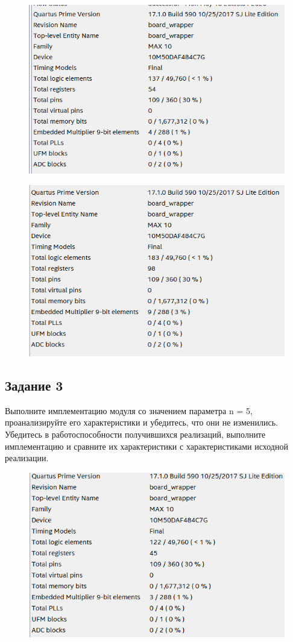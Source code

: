 \documentclass[a4paper,14pt]{article}
\begin{document}
	\begin{figure}[H]
		\centering
		\includegraphics[width=0.8\linewidth]{images/z2_5}
		\caption{}
		\label{fig:z25}
	\end{figure}
	
	\begin{figure}[H]
		\centering
		\includegraphics[width=0.8\linewidth]{images/z2_10}
		\caption{}
		\label{fig:z210}
	\end{figure}
	
	
	\subsection{Задание 3}
	
	Выполните имплементацию модуля со значением параметра n = 5, проанализируйте его характеристики и убедитесь, что они не изменились. Убедитесь в работоспособности получившихся реализаций, выполните имплементацию и сравните их	характеристики с характеристиками исходной реализации.
	

	\begin{figure}[H]
		\centering
		\includegraphics[width=0.8\linewidth]{images/z3_4}
		\caption{}
		\label{fig:z34}
	\end{figure}
\end{document}
